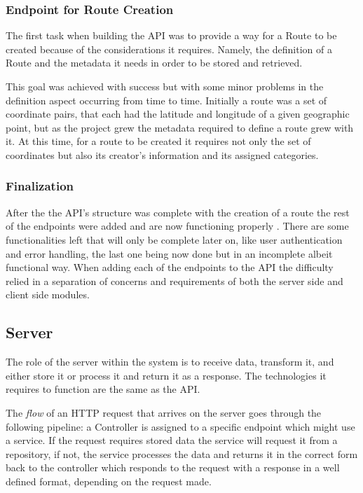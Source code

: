 \documentclass{article}
\begin{document}
            \newpage

            \subsubsection*{Endpoint for Route Creation}
            The first task when building the API was to provide a way for a Route to be created because of the considerations it requires. Namely, the 
            definition of a Route and the metadata it needs in order to be stored and retrieved.\par
            
            This goal was achieved with success \cite{routecreationdocs} but with some minor problems in the definition aspect occurring from time to time. 
            Initially a route was a set of coordinate pairs, that each had the latitude and longitude of a given geographic point, but 
            as the project grew the metadata required to define a route grew with it. At this time, for a route to be created it requires not only the 
            set of coordinates but also its creator's information and its assigned categories.

            \subsubsection*{Finalization}
            After the the API's structure was complete with the creation of a route the rest of the endpoints were added and are now functioning properly \cite{apidocs}.
            There are some functionalities left that will only be complete later on, like user authentication and error handling, the last one being now done 
            but in an incomplete albeit functional way.
            When adding each of the endpoints to the API the difficulty relied in a separation of concerns and requirements of both the server side and client side modules.
        
            \newpage
        
        \subsection{Server}    
            The role of the server within the system is to receive data, transform it, and either store it or process it and return it as a response. The technologies
            it requires to function are the same as the API.\par
            The \textit{flow} of an HTTP request that arrives on the server goes through the following pipeline: a Controller is assigned to a specific endpoint which might use
            a service. If the request requires stored data the service will request it from a repository, if not, the service processes the data and returns 
            it in the correct form back to the controller which responds to the request with a response in a well defined format, depending on the request made. 
\end{document}
